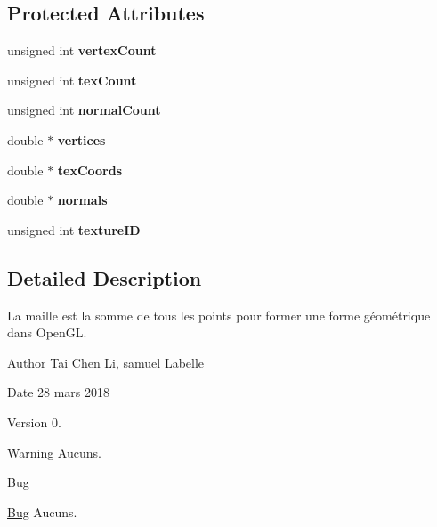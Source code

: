 \subsection*{Protected Attributes}
\begin{DoxyCompactItemize}
\item 
\hypertarget{class_model_aef8356f6096d0acb524a2dcd00c9e846}{}unsigned int {\bfseries vertex\+Count}\label{class_model_aef8356f6096d0acb524a2dcd00c9e846}

\item 
\hypertarget{class_model_a2f811c1e5a739a274f3533b286b01d00}{}unsigned int {\bfseries tex\+Count}\label{class_model_a2f811c1e5a739a274f3533b286b01d00}

\item 
\hypertarget{class_model_a3f823f731f25148bdc68ca464f960266}{}unsigned int {\bfseries normal\+Count}\label{class_model_a3f823f731f25148bdc68ca464f960266}

\item 
\hypertarget{class_model_a14417491d4b3b245104d19630c5b757c}{}double $\ast$ {\bfseries vertices}\label{class_model_a14417491d4b3b245104d19630c5b757c}

\item 
\hypertarget{class_model_ae2eee8e706c0f99a026e75e6ac03f853}{}double $\ast$ {\bfseries tex\+Coords}\label{class_model_ae2eee8e706c0f99a026e75e6ac03f853}

\item 
\hypertarget{class_model_a34e9b7eb4b1c7afffc32a6bf19416734}{}double $\ast$ {\bfseries normals}\label{class_model_a34e9b7eb4b1c7afffc32a6bf19416734}

\item 
\hypertarget{class_model_a83576072a6cd63739163f88a3c4d96c0}{}unsigned int {\bfseries texture\+I\+D}\label{class_model_a83576072a6cd63739163f88a3c4d96c0}

\end{DoxyCompactItemize}


\subsection{Detailed Description}
La maille est la somme de tous les points pour former une forme géométrique dans Open\+G\+L. 

\begin{DoxyAuthor}{Author}
Tai Chen Li, samuel Labelle 
\end{DoxyAuthor}
\begin{DoxyDate}{Date}
28 mars 2018 
\end{DoxyDate}
\begin{DoxyVersion}{Version}
0. 
\end{DoxyVersion}
\begin{DoxyWarning}{Warning}
Aucuns. 
\end{DoxyWarning}
\begin{DoxyRefDesc}{Bug}
\item[\hyperlink{bug__bug000009}{Bug}]Aucuns. \end{DoxyRefDesc}


